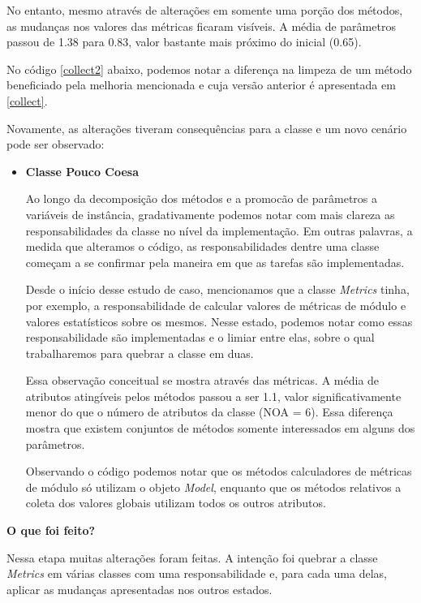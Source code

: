 No entanto, mesmo através de alterações em somente uma porção dos métodos, as
mudanças nos valores das métricas ficaram visíveis. A média de parâmetros passou
de 1.38 para 0.83, valor bastante mais próximo do inicial (0.65).

No código \ref{collect2} abaixo, podemos notar a diferença na limpeza de um método
beneficiado pela melhoria mencionada e cuja versão anterior é apresentada em \ref{collect}.



Novamente, as alterações tiveram consequências para a classe e um novo cenário pode
ser observado:

\begin{itemize}
\item
\textbf{Classe Pouco Coesa}

Ao longo da decomposição dos métodos e a promocão de parâmetros a variáveis de instância,
gradativamente podemos notar com mais clareza as responsabilidades da classe no nível da
implementação. Em outras palavras, a medida que alteramos o código, as responsabilidades
dentre uma classe começam a se confirmar pela maneira em que as tarefas são implementadas.

Desde o início desse estudo de caso, mencionamos que a classe \textit{Metrics} tinha, por exemplo, a
responsabilidade de calcular valores de métricas de módulo e valores estatísticos sobre os mesmos.
Nesse estado, podemos notar como essas responsabilidade são implementadas e o limiar entre elas,
sobre o qual trabalharemos para quebrar a classe em duas.

Essa observação conceitual se mostra através das métricas. A média de atributos atingíveis
pelos métodos passou a ser 1.1, valor significativamente menor do que o número de atributos
da classe (NOA = 6). Essa diferença mostra que existem conjuntos de métodos somente interessados
em alguns dos parâmetros.

Observando o código podemos notar que os métodos calculadores de métricas de módulo só utilizam
o objeto \textit{Model}, enquanto que os métodos relativos a coleta dos valores globais utilizam
todos os outros atributos.

\end{itemize}


\vskip 0.5cm
\textbf{O que foi feito?}

Nessa etapa muitas alterações foram feitas. A intenção foi quebrar a classe \textit{Metrics}
em várias classes com uma responsabilidade e, para cada uma delas, aplicar as mudanças apresentadas
nos outros estados.


